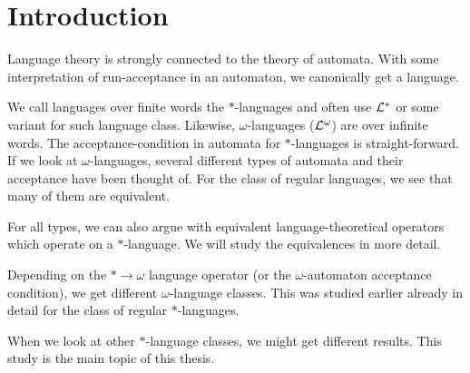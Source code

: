 
\section{Introduction}

Language theory is strongly connected to the theory of automata. With some interpretation of run-acceptance in an automaton, we canonically get a language.

We call languages over finite words the $*$-languages and often use $\mathcal{L}^*$ or some variant for such language class. Likewise, $\omega$-languages ($\mathcal{L}^\omega$) are over infinite words. The acceptance-condition in automata for $*$-languages is straight-forward. If we look at $\omega$-languages, several different types of automata and their acceptance have been thought of. For the class of regular languages, we see that many of them are equivalent.

For all types, we can also argue with equivalent language-theoretical operators which operate on a $*$-language. We will study the equivalences in more detail.

Depending on the $* \rightarrow \omega$ language operator (or the $\omega$-automaton acceptance condition), we get different $\omega$-language classes. This was studied earlier already in detail for the class of regular $*$-languages.

When we look at other $*$-language classes, we might get different results. This study is the main topic of this thesis.
